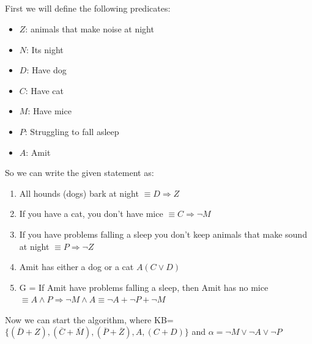 \documentclass{article}
\begin{document}
\subsection{}
First we will define the following predicates:
\begin{itemize}
    \item $Z$: animals that make noise at night
    \item $N$: Its night 
    \item $D$: Have dog 
    \item $C$: Have cat
    \item $M$: Have mice
    \item $P$: Struggling to fall asleep
    \item $A$: Amit 
\end{itemize}
So we can write the given statement as:
\begin{enumerate}
    \item All hounds (dogs) bark at night $\equiv D \Rightarrow Z$
    \item If you have a cat, you don’t have mice $\equiv C \Rightarrow \neg M$
    \item If you have problems falling a sleep you don’t keep animals that make sound at night $\equiv P \Rightarrow \neg Z$
    \item Amit has either a dog or a cat $A(C\lor D)$
    \item G = If Amit have problems falling a sleep, then Amit has no mice $ \equiv A \land P \Rightarrow \neg M \land A \equiv \neg A + \neg P + \neg M $
\end{enumerate}
Now we can start the algorithm, where KB=$\{(\overline D + Z),(\overline  C + \overline  M),( \overline  P + \overline  Z),A,(C + D)\}$ and $\alpha = \neg M \lor \neg A \lor \neg P$\\
\end{document}
